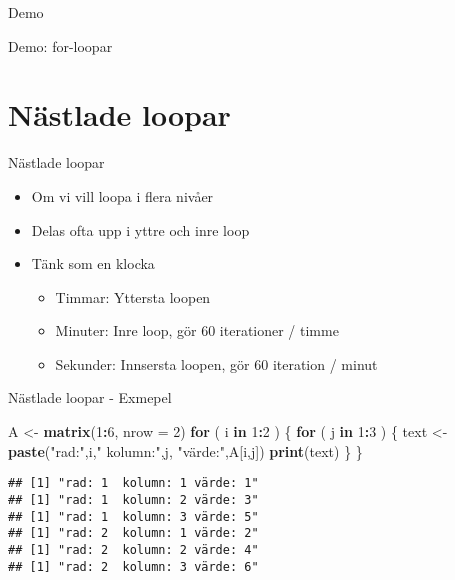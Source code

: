 \documentclass[
  11pt,
  ignorenonframetext,
]{beamer}
\newenvironment{Shaded}{\begin{snugshade}}{\end{snugshade}}
\newcommand{\AttributeTok}[1]{\textcolor[rgb]{0.13,0.29,0.53}{#1}}
\newcommand{\ControlFlowTok}[1]{\textcolor[rgb]{0.13,0.29,0.53}{\textbf{#1}}}
\newcommand{\DecValTok}[1]{\textcolor[rgb]{0.00,0.00,0.81}{#1}}
\newcommand{\FunctionTok}[1]{\textcolor[rgb]{0.13,0.29,0.53}{\textbf{#1}}}
\newcommand{\NormalTok}[1]{#1}
\newcommand{\OtherTok}[1]{\textcolor[rgb]{0.56,0.35,0.01}{#1}}
\newcommand{\SpecialCharTok}[1]{\textcolor[rgb]{0.81,0.36,0.00}{\textbf{#1}}}
\newcommand{\StringTok}[1]{\textcolor[rgb]{0.31,0.60,0.02}{#1}}
\providecommand{\tightlist}{%
  \setlength{\itemsep}{0pt}\setlength{\parskip}{0pt}}
\begin{document}
\begin{frame}{Demo}
\label{demo-1}
\begin{block}{Demo: for-loopar}
\label{demo-for-loopar}
\end{block}
\end{frame}

\section{Nästlade loopar}\label{nuxe4stlade-loopar}

\begin{frame}{Nästlade loopar}
\label{nuxe4stlade-loopar-1}
\begin{itemize}
\tightlist
\item
  Om vi vill loopa i flera nivåer
\item
  Delas ofta upp i yttre och inre loop
\item
  Tänk som en klocka

  \begin{itemize}
  \tightlist
  \item
    Timmar: Yttersta loopen
  \item
    Minuter: Inre loop, gör 60 iterationer / timme
  \item
    Sekunder: Innsersta loopen, gör 60 iteration / minut
  \end{itemize}
\end{itemize}
\end{frame}

\begin{frame}[fragile]{Nästlade loopar - Exmepel}
\label{nuxe4stlade-loopar---exmepel}
\begin{Shaded}
\begin{Highlighting}[]
\NormalTok{A }\OtherTok{\textless{}{-}} \FunctionTok{matrix}\NormalTok{(}\DecValTok{1}\SpecialCharTok{:}\DecValTok{6}\NormalTok{, }\AttributeTok{nrow =} \DecValTok{2}\NormalTok{)}
\ControlFlowTok{for}\NormalTok{ ( i }\ControlFlowTok{in} \DecValTok{1}\SpecialCharTok{:}\DecValTok{2}\NormalTok{ ) \{}
  \ControlFlowTok{for}\NormalTok{ ( j }\ControlFlowTok{in} \DecValTok{1}\SpecialCharTok{:}\DecValTok{3}\NormalTok{ ) \{}
\NormalTok{    text }\OtherTok{\textless{}{-}} \FunctionTok{paste}\NormalTok{(}\StringTok{"rad:"}\NormalTok{,i,}\StringTok{" kolumn:"}\NormalTok{,j,}
                  \StringTok{"värde:"}\NormalTok{,A[i,j])}
    \FunctionTok{print}\NormalTok{(text)}
\NormalTok{  \}}
\NormalTok{\}}
\end{Highlighting}
\end{Shaded}

\pause

\begin{verbatim}
## [1] "rad: 1  kolumn: 1 värde: 1"
## [1] "rad: 1  kolumn: 2 värde: 3"
## [1] "rad: 1  kolumn: 3 värde: 5"
## [1] "rad: 2  kolumn: 1 värde: 2"
## [1] "rad: 2  kolumn: 2 värde: 4"
## [1] "rad: 2  kolumn: 3 värde: 6"
\end{verbatim}
\end{frame}
\end{document}
